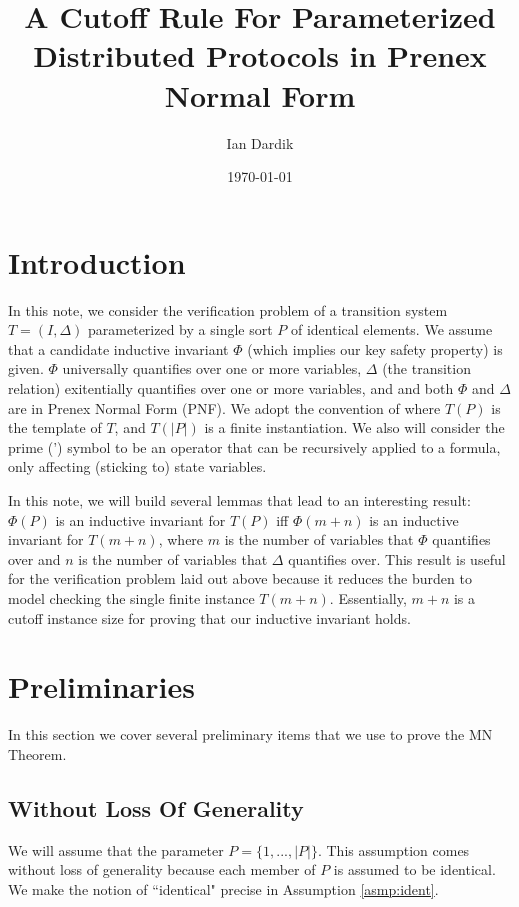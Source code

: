 \documentclass[12pt]{article}
\title{A Cutoff Rule For Parameterized Distributed Protocols in Prenex Normal Form}
\author{Ian Dardik}
\date{\today}
\theoremstyle{definition}
\theoremstyle{remark}
\begin{document}
\maketitle

\section{Introduction}
In this note, we consider the verification problem of a transition system $T=(I,\Delta)$ parameterized by a single sort $P$ of identical elements.  We assume that a candidate inductive invariant $\Phi$ (which implies our key safety property) is given.  $\Phi$ universally quantifies over one or more variables, $\Delta$ (the transition relation) exitentially quantifies over one or more variables, and and both $\Phi$ and $\Delta$ are in Prenex Normal Form (PNF).  We adopt the convention of \cite{goel2021symmetry} where $T(P)$ is the template of $T$, and $T(|P|)$ is a finite instantiation.  We also will consider the prime (') symbol to be an operator that can be recursively applied to a formula, only affecting (sticking to) state variables.

In this note, we will build several lemmas that lead to an interesting result: $\Phi(P)$ is an inductive invariant for $T(P)$ iff $\Phi(m+n)$ is an inductive invariant for $T(m+n)$, where $m$ is the number of variables that $\Phi$ quantifies over and $n$ is the number of variables that $\Delta$ quantifies over.  This result is useful for the verification problem laid out above because it reduces the burden to model checking the single finite instance $T(m+n)$.  Essentially, $m+n$ is a cutoff instance size for proving that our inductive invariant holds.



\section{Preliminaries}
In this section we cover several preliminary items that we use to prove the MN Theorem.

\subsection{Without Loss Of Generality}
We will assume that the parameter $P = \{1,...,|P|\}$.  This assumption comes without loss of generality because each member of $P$ is assumed to be identical.  We make the notion of ``identical" precise in Assumption \ref{asmp:ident}.
\end{document}
